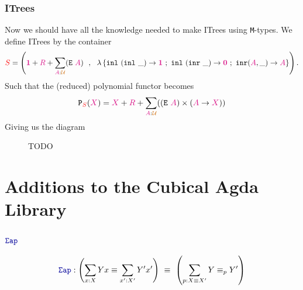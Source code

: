 \documentclass[twoside,11pt,openright]{report}
\theoremstyle{plain} %
\theoremstyle{definition}
\theoremstyle{remark}
\newcommand*{\type}[1]{\textcolor{magenta!90!black}{#1}}
\newcommand*{\container}[1]{\textcolor{red}{#1}}
\newcommand*{\universe}[1]{\textcolor{orange!80!black}{#1}}
\newcommand*{\unit}{\type{\textbf{1}}}
\newcommand*{\empt}{\type{\textbf{0}}}
\newcommand*{\function}[1]{\textcolor{blue!60!black}{\ensuremath{\mathtt{#1}}}}
\newcommand*{\typeformer}[1]{\ensuremath{\mathtt{#1}}}
\newcommand*{\functor}[1]{\ensuremath{\mathbf{\mathtt{#1}}}}
\begin{document}
\subsection{ITrees}
Now we should have all the knowledge needed to make ITrees using \texttt{M}-types. We define ITrees by the container
\begin{equation}
  \container{S} = \left( \unit+\type{R}+\sum_{\type{A}:\universe{\mathcal{U}}} (\typeformer{E}~\type{A}) ~~,~~ \lambda\left\{ \texttt{inl}~(\texttt{inl}~\_) \rightarrow \unit ~;~ \texttt{inl}~(\texttt{inr}~\_) \rightarrow \empt ~;~ \texttt{inr} (\type{A},\_)  \rightarrow \type{A} \right\} \right).
\end{equation}
Such that the (reduced) polynomial functor becomes
\begin{equation}
  \functor{P}_{\container{S}}(\type{X}) = \type{X} + \type{R} + \sum_{\type{A} : \universe{\mathcal{U}}} ((\typeformer{E}~\type{A}) \times (\type{A} \rightarrow \type{X}))
\end{equation}
Giving us the diagram
\begin{figure}[h]
  \centering
  \caption{TODO}
\end{figure}


\chapter{Additions to the Cubical Agda Library}
\section{\(\function{\Sigma ap}\)}
\begin{equation}
  \function{\Sigma ap} : \left(\sum_{x : X} Y x \equiv \sum_{x' : X'} Y' x' \right) ~ \equiv ~ \left( \sum_{p : X \equiv X'} Y \equiv_p Y' \right)
\end{equation}
\end{document}
